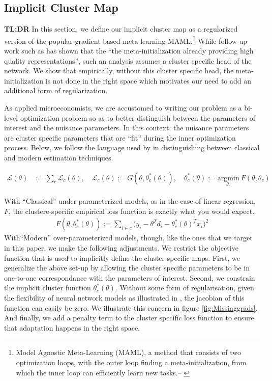 \documentclass[a4paper,12pt]{article}
\begin{document}
\subsection{Implicit Cluster Map}
\textbf{TL;DR} In this section, we define our implicit cluster map as a regularized version of the popular gradient based meta-learning MAML.\footnote{Model Agnostic Meta-Learning (MAML), a method that consists of two optimization loops, with the outer loop finding a meta-initialization,
from which the inner loop can efficiently learn new tasks.-- \cite{raghu2019rapid}} While follow-up work such as \cite{raghu2019rapid} has shown that the ``the meta-initialization already providing high quality
representations'', such an analysis assumes a cluster specific head of the network. We show that empirically, without this cluster specific head, the meta-initialization is not done in the right space which motivates our need to add an additional form of regularization.

As applied microeconomists, we are accustomed to writing our problem as a bi-level optimization problem so as to better distinguish between the parameters of interest and the nuisance parameters. In this context, the nuisance parameters are cluster specific parameters that are ``fit'' during the inner optimization process. Below, we follow the language used by \cite{belkin2021fit} in distinguishing between classical and modern estimation techniques.
 
\begin{align*}
    \mathcal{L}(\theta) &:= \sum _c \mathcal{L}_c(\theta), \quad \mathcal{L}_c(\theta) := G(\theta, \theta^*_c(\theta)), \quad  \theta_c^*(\theta) := \underset{\theta_c}{\textrm{argmin}} \ F(\theta, \theta_c) 
\end{align*}

With “Classical” under-parameterized models, as in the case of linear regression, $F$, the clustere-specific empirical loss function is exactly what you would expect. 
\begin{align*}
    F(\theta, \theta_c^*(\theta)) := \sum _{i \in c}\big(y_i - \theta^Td_i - \theta _c^*(\theta)^Tx_i \big)^2
\end{align*}
 With“Modern” over-parameterized models, though, like the ones that we target in this paper, we make the following adjustments. 
 We restrict the objective function that is used to implicitly define the cluster specific maps. First, we generalize the above set-up by allowing the cluster specific parameters to be in one-to-one correspondance with the parameters of interest. Second, we constrain the implicit cluster function $\theta_c^*(\theta)$. Without some form of regularisation, given the flexibility of neural network models as illustrated in \cite{zhang2021understanding}, the jacobian of this function can easily be zero. We illustrate this concern in figure \ref{fig:Missinggrads}. And finally, we add a penalty term to the cluster specific loss function to ensure that adaptation happens in the right space. 
 
\end{document}
